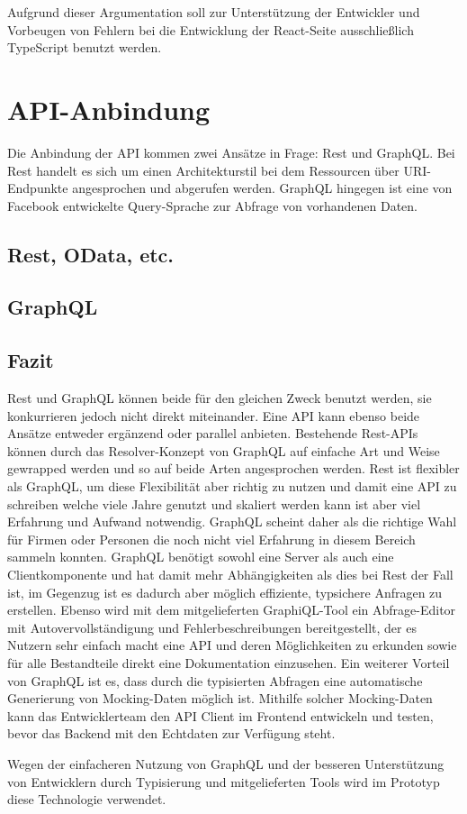 Aufgrund dieser Argumentation soll zur Unterstützung der Entwickler und Vorbeugen von Fehlern bei die Entwicklung der React-Seite ausschließlich TypeScript benutzt werden. 

\section{API-Anbindung}

Die Anbindung der API kommen zwei Ansätze in Frage: Rest und GraphQL. Bei Rest handelt es sich um einen Architekturstil bei dem Ressourcen über URI-Endpunkte angesprochen und abgerufen werden. GraphQL hingegen ist eine von Facebook entwickelte Query-Sprache zur Abfrage von vorhandenen Daten.

\subsection{Rest, OData, etc.}

\subsection{GraphQL}

\subsection{Fazit}

Rest und GraphQL können beide für den gleichen Zweck benutzt werden, sie konkurrieren jedoch nicht direkt miteinander. Eine API kann ebenso beide Ansätze entweder ergänzend oder parallel anbieten. Bestehende Rest-APIs können durch das Resolver-Konzept von GraphQL auf einfache Art und Weise gewrapped werden und so auf beide Arten angesprochen werden. Rest ist flexibler als GraphQL, um diese Flexibilität aber richtig zu nutzen und damit eine API zu schreiben welche viele Jahre genutzt und skaliert werden kann ist aber viel Erfahrung und Aufwand notwendig. GraphQL scheint daher als die richtige Wahl für Firmen oder Personen die noch nicht viel Erfahrung in diesem Bereich sammeln konnten. GraphQL benötigt sowohl eine Server als auch eine Clientkomponente und hat damit mehr Abhängigkeiten als dies bei Rest der Fall ist, im Gegenzug ist es dadurch aber möglich effiziente, typsichere Anfragen zu erstellen. Ebenso wird mit dem mitgelieferten GraphiQL-Tool ein Abfrage-Editor mit Autovervollständigung und Fehlerbeschreibungen bereitgestellt, der es Nutzern sehr einfach macht eine API und deren Möglichkeiten zu erkunden sowie für alle Bestandteile direkt eine Dokumentation einzusehen. Ein weiterer Vorteil von GraphQL ist es, dass durch die typisierten Abfragen eine automatische Generierung von Mocking-Daten möglich ist. Mithilfe solcher Mocking-Daten kann das Entwicklerteam den API Client im Frontend entwickeln und testen, bevor das Backend mit den Echtdaten zur Verfügung steht.

Wegen der einfacheren Nutzung von GraphQL und der besseren Unterstützung von Entwicklern durch Typisierung und mitgelieferten Tools wird im Prototyp diese Technologie verwendet.
